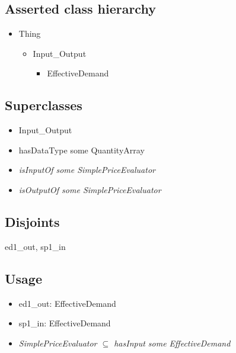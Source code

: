 \documentclass{article}
\begin{document}
\subsection*{Asserted class hierarchy}

\begin{itemize}
\renewcommand{\labelitemi}{$\bullet$}
\renewcommand{\labelitemii}{$\bullet$}
\renewcommand{\labelitemiii}{$\bullet$}
    \item Thing
    \begin{itemize}
    \item Input\_Output
        \begin{itemize}
        \item EffectiveDemand
        \end{itemize}
    \end{itemize}
\end{itemize}

\subsection*{Superclasses}

\begin{itemize}
\item Input\_Output
\item hasDataType some QuantityArray
\item \emph{isInputOf some SimplePriceEvaluator}
\item \emph{isOutputOf some SimplePriceEvaluator}
\end{itemize}

\subsection*{Disjoints}

ed1\_out, sp1\_in

\subsection*{Usage}

\begin{itemize}
\item ed1\_out: EffectiveDemand
\item sp1\_in: EffectiveDemand
\item \emph{SimplePriceEvaluator $\subseteq$ hasInput some EffectiveDemand}
\end{itemize}
\end{document}
